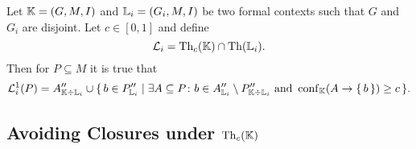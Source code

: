 \begin{Proposition}
  \label{prop:computing-confident-closure-first-try}
  Let ${\mathbb{K}} = (G, M, I)$ and ${\mathbb{L}}_{i} = (G_{i}, M, I)$ be two formal contexts such
  that $G$ and $G_{i}$ are disjoint.  Let $c \in [0,1]$ and define
  \begin{equation*}
    \mathcal{L}_{i} = \operatorname{Th}_{c}({\mathbb{K}}) \cap \operatorname{Th}({\mathbb{L}}_{i}).
  \end{equation*}
  Then for $P \subseteq M$ it is true that
  \begin{equation*}
    \mathcal{L}_{i}^{1}(P) = A_{{\mathbb{K}} \div {\ensuremath{\mathbb{L}}}_{i}}'' \cup {\ensuremath{\{\, b \in P_{{\mathbb{L}}_{i}}'' \mid \exists A \subseteq P \colon b \in A_{{\mathbb{L}}_{i}}'' \setminus P_{{\mathbb{K}}
      \div {\ensuremath{\mathbb{L}}}_{i}}'' \text{ and } \operatorname{conf}_{{\mathbb{K}}}(A \to {\ensuremath{\{\, b \,\}}}) \ge c \,\}}}.
  \end{equation*}
\end{Proposition}

%

\subsection{Avoiding Closures under $\operatorname{Th}_{c}({\mathbb{K}})$}
\label{sec:poss-fast-expl}

%


